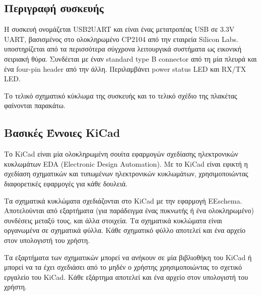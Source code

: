 \documentclass[a4paper]{article}
\begin{document}
\subsection{Περιγραφή συσκευής}
Η συσκευή ονομάζεται USB2UART και είναι ένας μετατροπέας USB σε 3.3V UART, βασισμένος στο ολοκληρωμένο \textenglish{CP2104} από την εταιρεία Silicon Labs. υποστηρίζεται από τα περισσότερα σύγχρονα λειτουργικά συστήματα ως εικονική σειριακή θύρα. Συνδέεται με έναν standard type B connector από τη μία πλευρά και ένα four-pin header από την άλλη. Περιλαμβάνει power status \textenglish{LED} και RX/TX \textenglish{LED}.

Το τελικό σχηματικό κύκλωμα της συσκευής και το τελικό σχέδιο της πλακέτας φαίνονται παρακάτω.

\begin{figure}
  \begin{center}
    \label{fig:kicad-main}
  \end{center}
\end{figure}

\begin{figure}
  \begin{center}
    \label{fig:kicad-main}
  \end{center}
\end{figure}

\subsection{Βασικές Έννοιες KiCad}
Το \textenglish{KiCad} είναι μία ολοκληρωμένη σουίτα εφαρμογών σχεδίασης ηλεκτρονικών κυκλωμάτων \textenglish{EDA (Electronic Design Automation)}. Με το \textenglish{KiCad} είναι εφικτή η σχεδίαση σχηματικών και τυπωμένων ηλεκτρονικών κυκλωμάτων, χρησιμοποιώντας διαφορετικές εφαρμογές για κάθε δουλειά.

Τα σχηματικά κυκλώματα σχεδιάζονται στο \textenglish{KiCad} με την εφαρμογή \textenglish{EEschema}. Αποτελούνται από εξαρτήματα (για παράδειγμα ένας πυκνωτής ή ένα ολοκληρωμένο) συνδέσεις μεταξύ τους, και άλλα στοιχεία. Τα σχηματικά κυκλώματα είναι οργανωμένα σε σχηματικά φύλλα. Κάθε σχηματικό φύλλο αποτελεί και ένα αρχείο στον υπολογιστή του χρήστη.

Τα εξαρτήματα των σχηματικών μπορεί να ανήκουν σε μία βιβλιοθήκη του \textenglish{KiCad} ή μπορεί να τα έχει σχεδιάσει από το μηδέν ο χρήστης χρησιμοποιώντας το σχετικό εργαλείο του \textenglish{KiCad}. Κάθε εξάρτημα αποτελεί και ένα αρχείο στον υπολογιστή του χρήστη.
\end{document}
